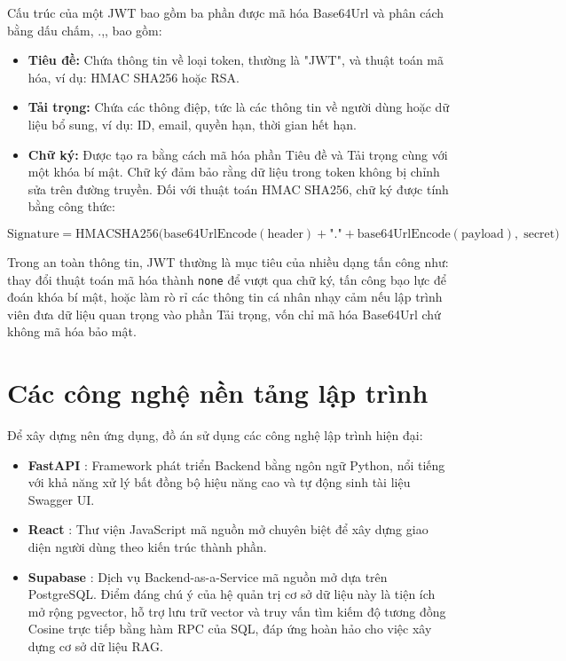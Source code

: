 Cấu trúc của một JWT bao gồm ba phần được mã hóa Base64Url và phân cách bằng dấu chấm, .,, bao gồm:
\begin{itemize}
    \item \textbf{Tiêu đề:} Chứa thông tin về loại token, thường là "JWT", và thuật toán mã hóa, ví dụ: HMAC SHA256 hoặc RSA.
    \item \textbf{Tải trọng:} Chứa các thông điệp, tức là các thông tin về người dùng hoặc dữ liệu bổ sung, ví dụ: ID, email, quyền hạn, thời gian hết hạn.
    \item \textbf{Chữ ký:} Được tạo ra bằng cách mã hóa phần Tiêu đề và Tải trọng cùng với một khóa bí mật. Chữ ký đảm bảo rằng dữ liệu trong token không bị chỉnh sửa trên đường truyền. Đối với thuật toán HMAC SHA256, chữ ký được tính bằng công thức:
\end{itemize}

\begin{equation}
\text{Signature} = \text{HMACSHA256}\Big(\text{base64UrlEncode}(\text{header}) + \text{"."} + \text{base64UrlEncode}(\text{payload}),\; \text{secret}\Big)
\end{equation}

Trong an toàn thông tin, JWT thường là mục tiêu của nhiều dạng tấn công như: thay đổi thuật toán mã hóa thành \texttt{none} để vượt qua chữ ký, tấn công bạo lực để đoán khóa bí mật, hoặc làm rò rỉ các thông tin cá nhân nhạy cảm nếu lập trình viên đưa dữ liệu quan trọng vào phần Tải trọng, vốn chỉ mã hóa Base64Url chứ không mã hóa bảo mật.

\section{Các công nghệ nền tảng lập trình}
Để xây dựng nên ứng dụng, đồ án sử dụng các công nghệ lập trình hiện đại:
\begin{itemize}
    \item \textbf{FastAPI} \cite{fastapi2024}: Framework phát triển Backend bằng ngôn ngữ Python, nổi tiếng với khả năng xử lý bất đồng bộ hiệu năng cao và tự động sinh tài liệu Swagger UI.
    \item \textbf{React} \cite{react2024}: Thư viện JavaScript mã nguồn mở chuyên biệt để xây dựng giao diện người dùng theo kiến trúc thành phần.
    \item \textbf{Supabase} \cite{supabase2024}: Dịch vụ Backend-as-a-Service mã nguồn mở dựa trên PostgreSQL. Điểm đáng chú ý của hệ quản trị cơ sở dữ liệu này là tiện ích mở rộng pgvector, hỗ trợ lưu trữ vector và truy vấn tìm kiếm độ tương đồng Cosine trực tiếp bằng hàm RPC của SQL, đáp ứng hoàn hảo cho việc xây dựng cơ sở dữ liệu RAG.
\end{itemize}
